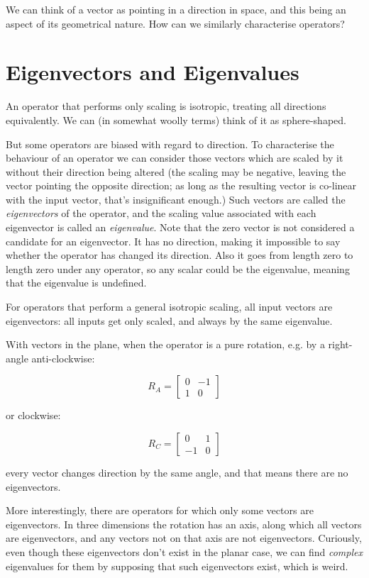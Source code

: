 We can think of a vector as pointing in a direction in space, and this being an aspect of its geometrical nature. How can we similarly characterise operators?

\section{Eigenvectors and Eigenvalues}\label{sec:vectors-eigen}

An operator that performs only scaling is isotropic, treating all directions equivalently. We can (in somewhat woolly terms) think of it as sphere-shaped.

But some operators are biased with regard to direction. To characterise the behaviour of an operator we can consider those vectors which are scaled by it without their direction being altered (the scaling may be negative, leaving the vector pointing the opposite direction; as long as the resulting vector is co-linear with the input vector, that's insignificant enough.) Such vectors are called the \textit{eigenvectors} of the operator, and the scaling value associated with each eigenvector is called an \textit{eigenvalue}. Note that the zero vector is not considered a candidate for an eigenvector. It has no direction, making it impossible to say whether the operator has changed its direction. Also it goes from length zero to length zero under any operator, so any scalar could be the eigenvalue, meaning that the eigenvalue is undefined.

For operators that perform a general isotropic scaling, all input vectors are eigenvectors: all inputs get only scaled, and always by the same eigenvalue.

With vectors in the plane, when the operator is a pure rotation, e.g. by a right-angle anti-clockwise:

$$R_A = \begin{bmatrix}0 & -1 \\ 1 & 0\end{bmatrix}$$

or clockwise:

$$R_C = \begin{bmatrix}0 & 1 \\ -1 & 0\end{bmatrix}$$

every vector changes direction by the same angle, and that means there are no eigenvectors.

More interestingly, there are operators for which only some vectors are eigenvectors. In three dimensions the rotation has an axis, along which all vectors are eigenvectors, and any vectors not on that axis are not eigenvectors. Curiously, even though these eigenvectors don't exist in the planar case, we can find \textit{complex} eigenvalues for them by supposing that such eigenvectors exist, which is weird.

